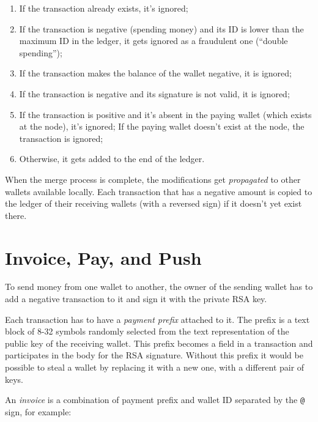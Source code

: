 \documentclass[11pt,oneside]{article}
\newcommand\dd[1]{\colorbox{gray!30}{\texttt{#1}}}
\begin{document}
\begin{enumerate}
\item If the transaction already exists, it's ignored;
\item If the transaction is negative (spending money) and its ID is lower than
the maximum ID in the ledger, it gets ignored as a fraudulent one (``double spending'');
\item If the transaction makes the balance of the wallet negative, it is ignored;
\item If the transaction is negative and its signature is not valid, it is ignored;
\item If the transaction is positive and it's absent in the paying wallet
(which exists at the node), it's ignored; If the paying wallet doesn't exist at the node,
the transaction is ignored;
\item Otherwise, it gets added to the end of the ledger.
\end{enumerate}

When the merge process is complete, the modifications get \emph{propagated} to other wallets
available locally. Each transaction that has a negative amount is
copied to the ledger of their receiving wallets (with a reversed sign)
if it doesn't yet exist there.

\section{Invoice, Pay, and Push}\label{sec:pay}

To send money from one wallet to another, the owner of the sending wallet
has to add a negative transaction to it and sign it with the private RSA key.

Each transaction has to have a \emph{payment prefix} attached to it.
The prefix is a text block of 8-32 symbols randomly selected from the
text representation of the public key of the receiving wallet. This prefix
becomes a field in a transaction and participates in the body for the RSA
signature. Without this prefix it would be possible to steal a wallet by
replacing it with a new one, with a different pair of keys.

An \emph{invoice} is a combination of payment prefix and wallet ID separated
by the \dd{@} sign, for example:
\end{document}

